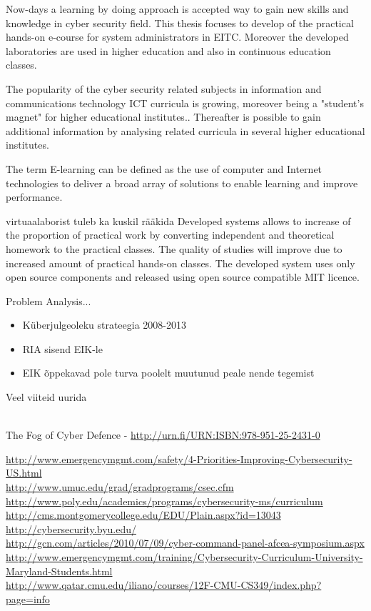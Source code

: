 Now-days a learning by doing approach is accepted way to gain new skills and knowledge in cyber security field. This thesis focuses to develop of the practical hands-on e-course for system administrators in \gls{EITC}. Moreover the developed laboratories are used in higher education and also in continuous education classes.


The popularity of the cyber security related subjects in information and communications technology \gls{ICT} curricula is growing, moreover being a "student's magnet" for higher educational institutes.\citep{CyberIsHot}. Thereafter is possible to gain additional information by analysing related curricula in several higher educational institutes.

The term E-learning can be defined as the use of computer and Internet technologies to deliver a broad array of solutions to enable learning and improve performance. \citep[p.~3]{food2011learning}

{\color{red} virtuaalaborist tuleb ka kuskil rääkida }
Developed systems allows to  increase of the proportion of practical work by converting independent and theoretical homework to  the practical classes. The quality of studies will improve due to increased amount of practical hands-on classes. The developed system uses only open source components and released using open source compatible MIT licence.

Problem Analysis...
\begin{itemize}
	\item Küberjulgeoleku strateegia 2008-2013
	\item RIA sisend EIK-le
	\item EIK õppekavad pole turva poolelt muutunud peale nende tegemist
\end{itemize}


Veel viiteid uurida 
{\scriptsize
\\

The Fog of Cyber Defence - \url{http://urn.fi/URN:ISBN:978-951-25-2431-0}

\url{http://www.emergencymgmt.com/safety/4-Priorities-Improving-Cybersecurity-US.html}\\
\url{http://www.umuc.edu/grad/gradprograms/csec.cfm}
\\
\url{http://www.poly.edu/academics/programs/cybersecurity-ms/curriculum}\\
\url{http://cms.montgomerycollege.edu/EDU/Plain.aspx?id=13043}\\
\url{http://cybersecurity.byu.edu/}\\
\url{http://gcn.com/articles/2010/07/09/cyber-command-panel-afcea-symposium.aspx}\\
\url{http://www.emergencymgmt.com/training/Cybersecurity-Curriculum-University-Maryland-Students.html}\\
\url{http://www.qatar.cmu.edu/iliano/courses/12F-CMU-CS349/index.php?page=info}\\
}

